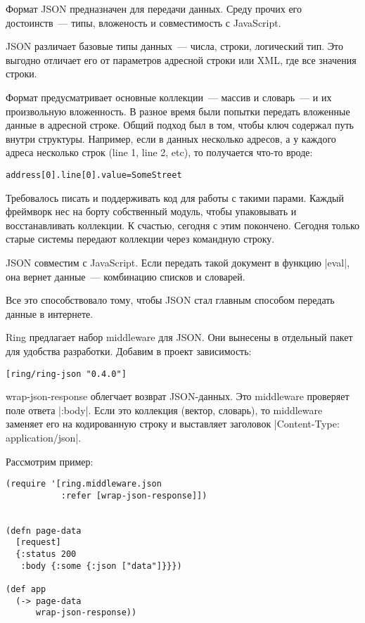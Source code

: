 Формат JSON предназначен для передачи данных. Среду прочих его достоинств~---
типы, вложеность и совместимость с JavaScript.

JSON различает базовые типы данных~--- числа, строки, логический тип. Это выгодно
отличает его от параметров адресной строки или XML, где все значения строки.

Формат предусматривает основные коллекции~--- массив и словарь~--- и их произвольную
вложенность. В разное время были попытки передать вложенные данные в адресной
строке. Общий подход был в том, чтобы ключ содержал путь внутри
структуры. Например, если в данных несколько адресов, а у каждого адреса
несколько строк (line 1, line 2, etc), то получается что-то вроде:

\begin{verbatim}
address[0].line[0].value=SomeStreet
\end{verbatim}

Требовалось писать и поддерживать код для работы с такими парами. Каждый
фреймворк нес на борту собственный модуль, чтобы упаковывать и восстанавливать
коллекции. К счастью, сегодня с этим покончено. Сегодня только старые системы
передают коллекции через командную строку.

JSON совместим с JavaScript. Если передать такой документ в функцию \spverb|eval|, она
вернет данные~--- комбинацию списков и словарей.

Все это способствовало тому, чтобы JSON стал главным способом передать данные в
интернете.

Ring предлагает набор middleware для JSON. Они вынесены в отдельный пакет для
удобства разработки. Добавим в проект зависимость:

\begin{verbatim}
[ring/ring-json "0.4.0"]
\end{verbatim}

wrap-json-response облегчает возврат JSON-данных. Это middleware проверяет поле
ответа \spverb|:body|. Если это коллекция (вектор, словарь), то middleware заменяет его
на кодированную строку и выставляет заголовок \spverb|Content-Type: application/json|.


Рассмотрим пример:

\begin{verbatim}
(require '[ring.middleware.json
           :refer [wrap-json-response]])


(defn page-data
  [request]
  {:status 200
   :body {:some {:json ["data"]}}})

(def app
  (-> page-data
      wrap-json-response))
\end{verbatim}

